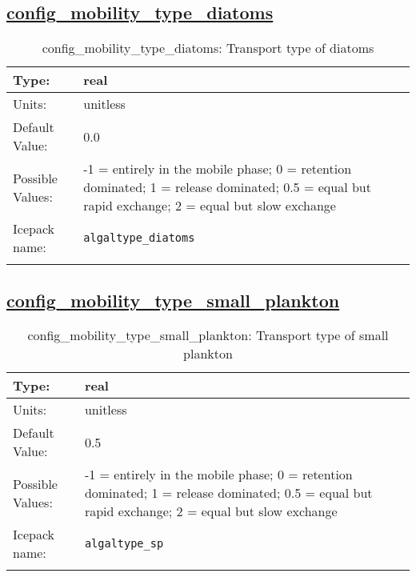 \subsection[config\_mobility\_type\_diatoms]{\hyperref[sec:nm_tab_biogeochemistry]{config\_mobility\_type\_diatoms}}
\label{subsec:nm_sec_config_mobility_type_diatoms}
\begin{center}
\begin{longtable}{| p{2.0in} || p{4.0in} |}
    \hline
    Type: & real \\
    \hline
    Units: & \si{unitless} \\
    \hline
    Default Value: & 0.0 \\
    \hline
    Possible Values: & -1 = entirely in the mobile phase; 0 = retention dominated; 1 = release dominated; 0.5 = equal but rapid exchange; 2 = equal but slow exchange \\
    \hline
    Icepack name: & \verb+algaltype_diatoms+ \\
    \hline
    \caption{config\_mobility\_type\_diatoms: Transport type of diatoms}
\end{longtable}
\end{center}
\subsection[config\_mobility\_type\_small\_plankton]{\hyperref[sec:nm_tab_biogeochemistry]{config\_mobility\_type\_small\_plankton}}
\label{subsec:nm_sec_config_mobility_type_small_plankton}
\begin{center}
\begin{longtable}{| p{2.0in} || p{4.0in} |}
    \hline
    Type: & real \\
    \hline
    Units: & \si{unitless} \\
    \hline
    Default Value: & 0.5 \\
    \hline
    Possible Values: & -1 = entirely in the mobile phase; 0 = retention dominated; 1 = release dominated; 0.5 = equal but rapid exchange; 2 = equal but slow exchange \\
    \hline
    Icepack name: & \verb+algaltype_sp+ \\
    \hline
    \caption{config\_mobility\_type\_small\_plankton: Transport type of small plankton}
\end{longtable}
\end{center}
